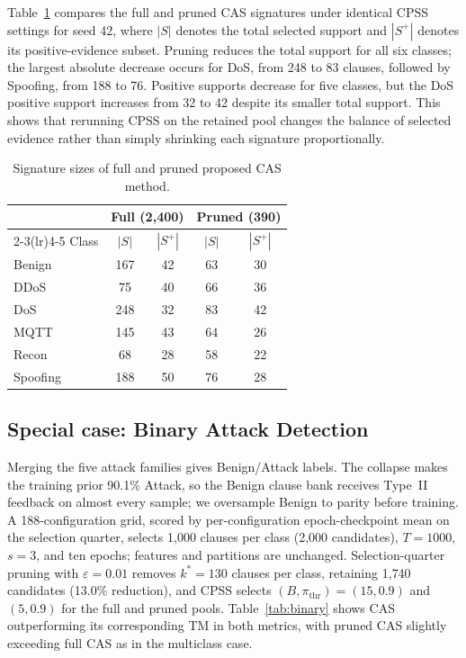 \documentclass[conference]{IEEEtran}
\begin{document}
Table~\ref{tab:reduction} compares the full and pruned CAS signatures
under identical CPSS settings for seed 42, where $|S|$ denotes the
total selected support and $|S^+|$ denotes its positive-evidence subset.
Pruning reduces the total support for all six classes; the largest
absolute decrease occurs for DoS, from 248 to 83 clauses, followed by
Spoofing, from 188 to 76. Positive supports decrease for five classes,
but the DoS positive support increases from 32 to 42 despite its smaller
total support. This shows that rerunning CPSS on the retained pool
changes the balance of selected evidence rather than simply shrinking
each signature proportionally.

\begin{table}[!htb]
\centering
\caption{Signature sizes of full and pruned proposed CAS method.}
\label{tab:reduction}
\footnotesize
\begin{tabular}{@{}lcccc@{}}
\toprule
& \multicolumn{2}{c}{Full (2,400)} & \multicolumn{2}{c}{Pruned (390)} \\
\cmidrule(lr){2-3}\cmidrule(lr){4-5}
Class & $|S|$ & $|S^+|$ & $|S|$ & $|S^+|$ \\
\midrule
Benign & 167 & 42 & 63 & 30 \\
DDoS & 75 & 40 & 66 & 36 \\
DoS & 248 & 32 & 83 & 42 \\
MQTT & 145 & 43 & 64 & 26 \\
Recon & 68 & 28 & 58 & 22 \\
Spoofing & 188 & 50 & 76 & 28 \\
\bottomrule
\end{tabular}
\end{table}

\subsection{Special case: Binary Attack Detection}
\begingroup
\color{blue}
\label{sec:binary}
Merging the five attack families gives Benign/Attack labels. The
collapse makes the training prior 90.1\% Attack, so the Benign clause
bank receives Type~II feedback on almost every sample; we oversample
Benign to parity before training. A 188-configuration grid, scored by
per-configuration epoch-checkpoint mean on the selection quarter,
selects 1{,}000 clauses per class (2{,}000 candidates), $T=1000$,
$s=3$, and ten epochs; features and partitions are unchanged.
Selection-quarter pruning with $\varepsilon=0.01$ removes $k^*=130$
clauses per class, retaining 1{,}740 candidates (13.0\% reduction),
and CPSS selects $(B,\pi_{\mathrm{thr}})=(15,0.9)$ and $(5,0.9)$ for
the full and pruned pools. Table~\ref{tab:binary} shows CAS
outperforming its corresponding TM in both metrics, with pruned CAS
slightly exceeding full CAS as in the multiclass case.
\end{document}

